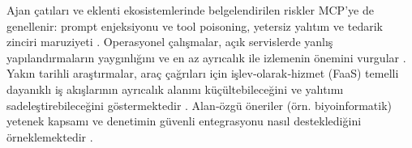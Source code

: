 Ajan çatıları ve eklenti ekosistemlerinde belgelendirilen riskler MCP’ye de genellenir: prompt enjeksiyonu ve tool poisoning, yetersiz yalıtım ve tedarik zinciri maruziyeti \cite{arXiv250323278,arXiv250812566}. Operasyonel çalışmalar, açık servislerde yanlış yapılandırmaların yaygınlığını ve en az ayrıcalık ile izlemenin önemini vurgular \cite{MDPIElectronics3267}. Yakın tarihli araştırmalar, araç çağrıları için işlev‑olarak‑hizmet (FaaS) temelli dayanıklı iş akışlarının ayrıcalık alanını küçültebileceğini ve yalıtımı sadeleştirebileceğini göstermektedir \cite{arXiv250907595}. Alan‑özgü öneriler (örn. biyoinformatik) yetenek kapsamı ve denetimin güvenli entegrasyonu nasıl desteklediğini örneklemektedir \cite{arXiv250708055}.

